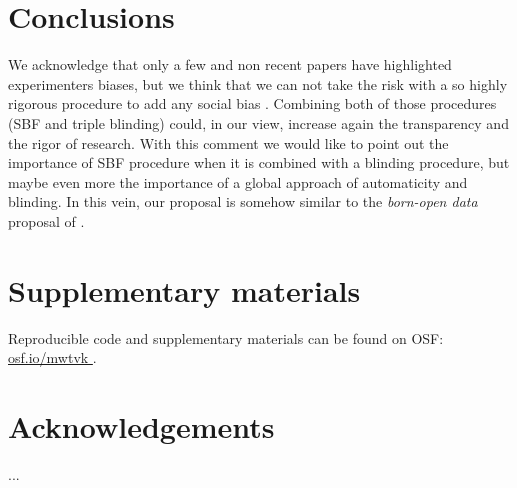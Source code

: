\documentclass[a4paper,man,natbib,floatsintext,donotrepeattitle]{apa6}
\begin{document}
\section{Conclusions}

We acknowledge that only a few and non recent papers have highlighted experimenters biases, but we think that we can not take the risk with a so highly rigorous procedure to add any social bias . Combining both of those procedures (SBF and triple blinding) could, in our view, increase again the transparency and the rigor of research. With this comment we would like to point out the importance of SBF procedure when it is combined with a blinding procedure, but maybe even more the importance of a global approach of automaticity and blinding. In this vein, our proposal is somehow similar to the \textit{born-open data} proposal of \cite{rouder_what_2016}. 

\section{Supplementary materials}\label{sec:supp}

Reproducible code and supplementary materials can be found on OSF: \url{osf.io/mwtvk
}.

\section{Acknowledgements}

...


\end{document}
